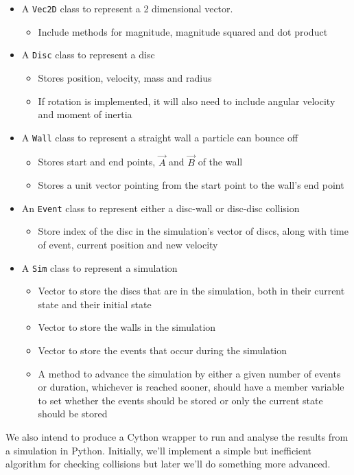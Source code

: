 \documentclass{article}
\begin{document}
\begin{itemize}
    \item A \texttt{Vec2D} class to represent a 2 dimensional vector.
    \begin{itemize}
        \item Include methods for magnitude, magnitude squared and dot product
    \end{itemize}
    \item A \texttt{Disc} class to represent a disc
    \begin{itemize}
        \item Stores position, velocity, mass and radius
        \item If rotation is implemented, it will also need to include angular velocity and moment of inertia
    \end{itemize}
    \item A \texttt{Wall} class to represent a straight wall a particle can bounce off
    \begin{itemize}
        \item Stores start and end points, $\vec{A}$ and $\vec{B}$ of the wall
        \item Stores a unit vector pointing from the start point to the wall's end point 
    \end{itemize}
    \item An \texttt{Event} class to represent either a disc-wall or disc-disc collision
    \begin{itemize}
        \item Store index of the disc in the simulation's vector of discs, along with time of event, current position and new velocity
    \end{itemize}
    \item A \texttt{Sim} class to represent a simulation
    \begin{itemize}
        \item Vector to store the discs that are in the simulation, both in their current state and their initial state
        \item Vector to store the walls in the simulation
        \item Vector to store the events that occur during the simulation 
        \item A method to advance the simulation by either a given number of events or duration, whichever is reached sooner, should have a member variable to set whether the events should be stored or only the current state should be stored
    \end{itemize}
\end{itemize}

We also intend to produce a Cython wrapper to run and analyse the results from a simulation in Python. Initially, we'll implement a simple but inefficient algorithm for checking collisions but later we'll do something more advanced.
\end{document}

